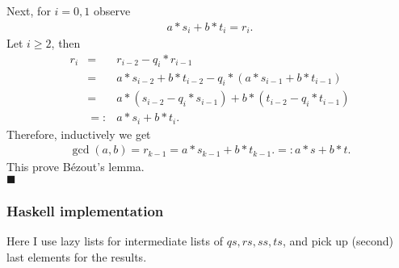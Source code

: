 \documentclass[11pt]{book}
\begin{document}
Next, for $i=0,1$ observe
\begin{eqnarray}
\label{guessOfRational}
a*s_i + b*t_i = r_i.
\end{eqnarray}
Let $i\geq 2$, then
\begin{eqnarray}
r_i &=& r_{i-2}  - q_i * r_{i-1} \\
&=& a*s_{i-2} + b*t_{i-2} - q_i *(a*s_{i-1} + b*t_{i-1} ) \\
&=& a*(s_{i-2} - q_i *s_{i-1}) + b* (t_{i-2} - q_i *t_{i-1} ) \\
&=:& a*s_i + b*t_i.
\end{eqnarray}
Therefore, inductively we get
\begin{eqnarray}
\gcd(a,b) = r_{k-1} = a*s_{k-1} + b*t_{k-1}. =: a*s + b*t.
\end{eqnarray}
This prove B\'ezout's lemma. \\
$\blacksquare$

\subsubsection{Haskell implementation}
\label{exGCDHaskell}
Here I use lazy lists for intermediate lists of $qs,rs,ss,ts$, and pick up (second) last elements for the results.
\end{document}
